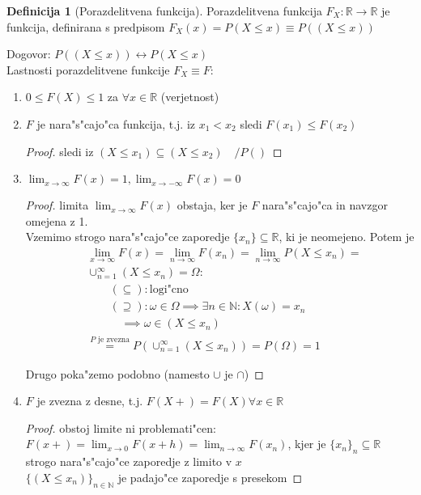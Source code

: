 \documentclass[a4paper,12pt]{article}
\theoremstyle{definition}
\newtheorem{defn}[counter]{Definicija}
\theoremstyle{remark}
\newcommand{\N}{\mathbb{N}}
\newcommand{\R}{\mathbb{R}}
\begin{document}
\begin{defn}[Porazdelitvena funkcija]
    Porazdelitvena funkcija $F_X: \R \to \R$ je funkcija, definirana s predpisom $F_X(x) = P(X \leq x) \equiv P((X \leq x))$
\end{defn}

Dogovor: $P((X \leq x)) \leftrightarrow P(X \leq x)$ \\
Lastnosti porazdelitvene funkcije $F_X \equiv F$:

\begin{enumerate}
    \item $0 \leq F(X) \leq 1$ za $\forall x \in \R$ (verjetnost)
    \item $F$ je nara"s"cajo"ca funkcija, t.j. iz $x_1 < x_2$ sledi $F(x_1) \leq F(x_2)$
        \begin{proof}
            sledi iz $(X \leq x_1) \subseteq (X \leq x_2) \quad / P()$
        \end{proof}
    \item $\lim_{x \to \infty} F(x) = 1, \lim_{x \to -\infty} F(x) = 0$
        \begin{proof}
            limita $\lim_{x \to \infty} F(x)$ obstaja, ker je $F$ nara"s"cajo"ca in navzgor omejena z 1. \\
            Vzemimo strogo nara"s"cajo"ce zaporedje $\{x_n\} \subseteq \R$, ki je neomejeno. Potem je
            \begin{align*}
                &\lim_{x \to \infty} F(x) = \lim_{n \to \infty} F(x_n) = \lim_{n \to \infty} P(X \leq x_n) = \\
                &\cup_{n = 1}^{\infty} (X \leq x_n) = \Omega: \\
                &\qquad (\subseteq): \text{logi"cno} \\
                &\qquad (\supseteq): \omega \in \Omega \implies \exists n \in \N: X(\omega) = x_n \\
                &\qquad \quad \implies \omega \in (X \leq x_n) \\
                &\stackrel{P \text{ je zvezna}}{=} P(\cup_{n=1}^{\infty} (X \leq x_n)) = P(\Omega) = 1
            \end{align*}

            Drugo poka"zemo podobno (namesto $\cup$ je $\cap$)
        \end{proof}
    \item $F$ je zvezna z desne, t.j. $F(X+) = F(X) \forall x \in \R$
        \begin{proof}
            obstoj limite ni problemati"cen: $F(x+) = \lim_{x \to 0} F(x+h) = \lim_{n \to \infty} F(x_n)$, kjer
            je $\{x_n\}_n \subseteq \R$ strogo nara"s"cajo"ce zaporedje z limito v $x$ \\
            $\{(X \leq x_n)\}_{n \in \N}$ je padajo"ce zaporedje s presekom


\end{proof}
\end{enumerate}
\end{document}
